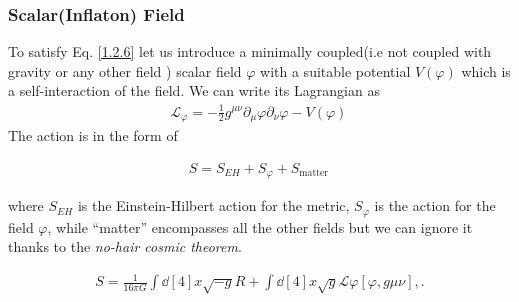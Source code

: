 \subsubsection{Scalar(Inflaton) Field }





\hspace{0.5cm}To satisfy Eq. \eqref{1.2.6} let us introduce a minimally coupled(i.e not coupled with gravity or any other field ) scalar field \(\varphi\)  with a suitable potential $V(\varphi)$ which is a self-interaction of the field. We can write its Lagrangian as 
\begin{align}
    \mathscr{L}_{\varphi} = -\frac{1}{2} g^{\mu\nu} \partial_{\mu}\varphi\partial_{\nu}\varphi - V(\varphi)\, \label{1.2.8}
\end{align}
The action is in the form of 

\begin{align}
    S = S_{EH} + S_\varphi + S _{\text{matter}}\,\label{1.2.9}
\end{align}

where \(S_{EH}\) is the Einstein-Hilbert action for the metric, \(S_\varphi \) is the action for the field \(\varphi \), while ``matter'' encompasses all the other fields but we can ignore it thanks to the \emph{no-hair cosmic theorem}.

\begin{align}
    S = \frac{1}{16 \pi G} \int \dd[4]{x} \sqrt{-g} R + \int \dd[4]{x} \sqrt{g} \mathscr{L}\varphi [\varphi , g{\mu \nu }],. \label{1.2.10}
\end{align}

